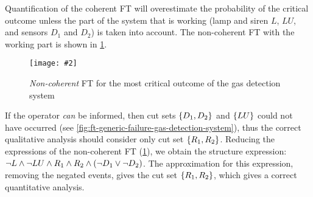 \documentclass[en,twoside,onehalfspacing,phd]{risethesis}
\newcommand{\includegraphicsaspectratio}[2][1]{%
  \texttt{[image: \#2]}%
}
\newcommand{\setsin}[1]{\ensuremath\left\{ #1 \right\}}
\newcommand{\parsin}[1]{\ensuremath\left( #1 \right)}
\begin{document}
Quantification of the coherent \ac{FT} will overestimate the probability of the critical outcome unless the part of the system that is working (lamp and siren $L$, $LU$, and sensors $D_1$ and $D_2$) is taken into account.
The non-coherent \ac{FT} with the working part is shown in \cref{fig:outcome-4-non-coherent-ft}.

\begin{figure}[t]
  \centering
  \includegraphicsaspectratio[0.65]{outcome-4-non-coherent-ft}
  \caption{\emph{Non-coherent} \ac{FT} for the most critical outcome of the gas detection system}
  \label{fig:outcome-4-non-coherent-ft}
\end{figure}

If the operator \emph{can} be informed, then cut sets $\setsin{D_1, D_2}$ and $\setsin{LU}$ could not have occurred (see \cref{fig:ft-generic-failure-gas-detection-system}), thus the correct qualitative analysis should consider only cut set $\setsin{R_1,R_2}$.
Reducing the expressions of the non-coherent \ac{FT} (\cref{fig:outcome-4-non-coherent-ft}), we obtain the structure expression: $\lnot L \land \lnot LU \land R_1 \land R_2 \land \parsin{\lnot D_1 \lor \lnot D_2}$.
The approximation for this expression, removing the negated events, gives the cut set $\setsin{R_1,R_2}$, which gives a correct quantitative analysis.




\end{document}
